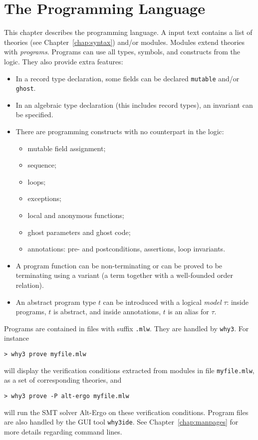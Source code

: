 \chapter{The \whyml Programming Language}
\label{chap:whyml}

This chapter describes the \whyml programming language.
A \whyml input text contains a list of theories (see
Chapter~\ref{chap:syntax}) and/or modules.
Modules extend theories with \emph{programs}.
Programs can use all types, symbols, and constructs from the logic.
They also provide extra features:
\begin{itemize}
\item
  In a record type declaration, some fields can be declared
  \texttt{mutable} and/or \texttt{ghost}.
\item
  In an algebraic type declaration (this includes record types), an
  invariant can be specified.
\item
  There are programming constructs with no counterpart in the logic:
  \begin{itemize}
  \item mutable field assignment;
  \item sequence;
  \item loops;
  \item exceptions;
  \item local and anonymous functions;
  \item ghost parameters and ghost code;
  \item annotations: pre- and postconditions, assertions, loop invariants.
  \end{itemize}
\item
  A program function can be non-terminating or can be proved
  to be terminating using a variant (a term together with a well-founded
  order relation).
\item
  An abstract program type $t$ can be introduced with a logical
  \emph{model} $\tau$: inside programs, $t$ is abstract, and inside
  annotations, $t$ is an alias for $\tau$.
\end{itemize}
%
Programs are contained in files with suffix \verb|.mlw|.
They are handled by \texttt{why3}. For instance
\begin{verbatim}
> why3 prove myfile.mlw
\end{verbatim}
will display the verification conditions extracted from modules in
file \texttt{myfile.mlw}, as a set of corresponding theories, and
\begin{verbatim}
> why3 prove -P alt-ergo myfile.mlw
\end{verbatim}
will run the SMT solver Alt-Ergo on these verification conditions.
Program files are also handled by the GUI tool \texttt{why3ide}.
See Chapter~\ref{chap:manpages} for more details regarding command lines.

